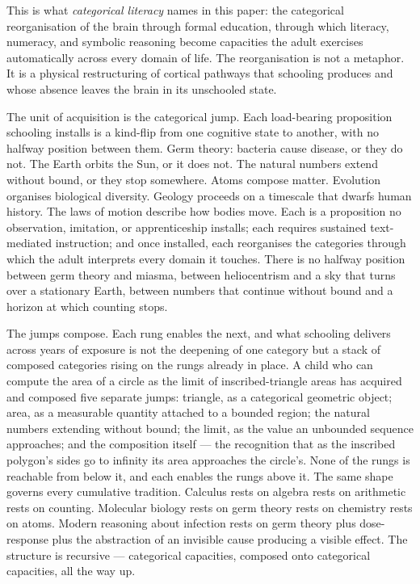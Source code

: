 \documentclass[12pt,letterpaper]{article}
\begin{document}
This is what \emph{categorical literacy} names in this paper: the
categorical reorganisation of the brain through formal education,
through which literacy, numeracy, and symbolic reasoning become
capacities the adult exercises automatically across every domain of
life. The reorganisation is not a metaphor. It is a physical
restructuring of cortical pathways that schooling produces and whose
absence leaves the brain in its unschooled state.

The unit of acquisition is the categorical jump. Each load-bearing
proposition schooling installs is a kind-flip from one cognitive
state to another, with no halfway position between them. Germ
theory: bacteria cause disease, or they do not. The Earth orbits
the Sun, or it does not. The natural numbers extend without bound,
or they stop somewhere. Atoms compose matter. Evolution organises
biological diversity. Geology proceeds on a timescale that dwarfs
human history. The laws of motion describe how bodies move. Each
is a proposition no observation, imitation, or apprenticeship
installs; each requires sustained text-mediated instruction; and
once installed, each reorganises the categories through which the
adult interprets every domain it touches. There is no halfway
position between germ theory and miasma, between heliocentrism and
a sky that turns over a stationary Earth, between numbers that
continue without bound and a horizon at which counting stops.

The jumps compose. Each rung enables the next, and what schooling
delivers across years of exposure is not the deepening of one
category but a stack of composed categories rising on the rungs
already in place. A child who can compute the area of a circle as
the limit of inscribed-triangle areas has acquired and composed
five separate jumps: triangle, as a categorical geometric object;
area, as a measurable quantity attached to a bounded region; the
natural numbers extending without bound; the limit, as the value an
unbounded sequence approaches; and the composition itself --- the
recognition that as the inscribed polygon's sides go to infinity
its area approaches the circle's. None of the rungs is reachable
from below it, and each enables the rungs above it. The same shape
governs every cumulative tradition. Calculus rests on algebra rests
on arithmetic rests on counting. Molecular biology rests on germ
theory rests on chemistry rests on atoms. Modern reasoning about
infection rests on germ theory plus dose-response plus the
abstraction of an invisible cause producing a visible effect. The
structure is recursive --- categorical capacities, composed onto
categorical capacities, all the way up.
\end{document}
